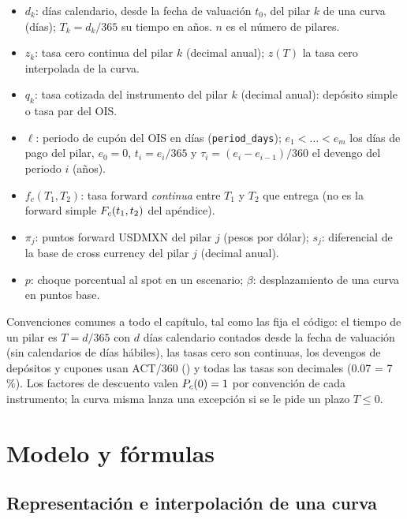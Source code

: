 {\raggedright
\begin{itemize}
  \item $d_k$: días calendario, desde la fecha de valuación $t_0$, del pilar $k$ de una curva (días);
        $T_k = d_k/365$ su tiempo en años. $n$ es el número de pilares.
  \item $z_k$: tasa cero continua del pilar $k$ (decimal anual); $z(T)$ la tasa cero interpolada de la curva.
  \item $q_k$: tasa cotizada del instrumento del pilar $k$ (decimal anual): depósito simple o tasa par del OIS.
  \item $\ell$: periodo de cupón del OIS en días (\texttt{period\_days}); $e_1<\dots<e_m$ los días de pago del
        pilar, $e_0=0$, $t_i = e_i/365$ y $\tau_i = (e_i-e_{i-1})/360$ el devengo del periodo $i$ (años).
  \item $f_c(T_1,T_2)$: tasa forward \emph{continua} entre $T_1$ y $T_2$ que entrega
         (no es la forward simple $F_{c}(t_1,t_2)$
        del apéndice).
  \item $\pi_j$: puntos forward USDMXN del pilar $j$ (pesos por dólar); $s_j$: diferencial de la base de cross
        currency del pilar $j$ (decimal anual).
  \item $p$: choque porcentual al spot en un escenario; $\beta$: desplazamiento de una curva en puntos base.
\end{itemize}
}

Convenciones comunes a todo el capítulo, tal como las fija el código: el tiempo de un pilar es
$T = d/365$ con $d$ días calendario contados desde la fecha de valuación (sin calendarios de días hábiles), las tasas
cero son continuas, los devengos de depósitos y cupones usan ACT/360
() y todas las tasas son decimales
(0.07 = 7\,\%). Los factores de descuento valen $P_{c}(0)=1$ por convención de cada instrumento; la curva misma
lanza una excepción si se le pide un plazo $T\le 0$.

\section{Modelo y fórmulas}\label{sec:cap02-modelo}

\subsection{Representación e interpolación de una curva}\label{sec:cap02-curva}

